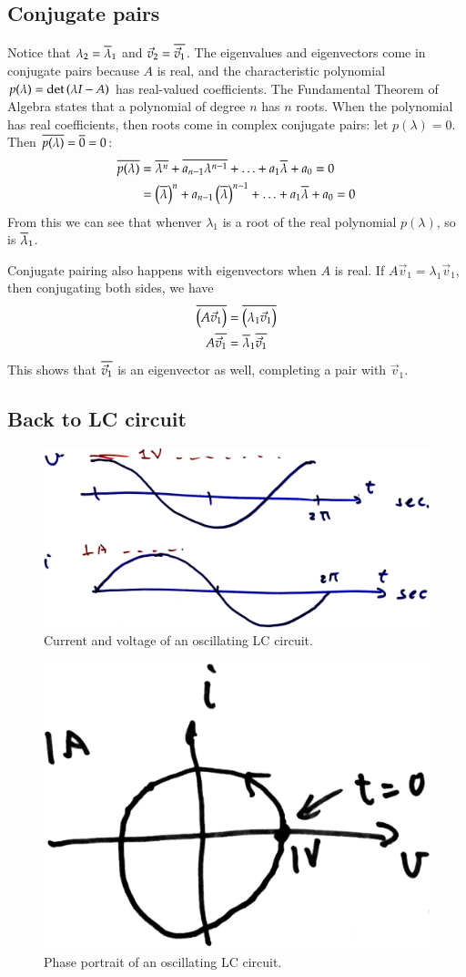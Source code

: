 \subsection{Conjugate pairs}
Notice that \(\lambda_2 = \overline \lambda_1\) and \(\vec v_2 = \overline{\vec v_1}\).
The eigenvalues and eigenvectors come in conjugate pairs because \(A\) is real, and the characteristic polynomial \(p(\lambda) = \det\del{\lambda I - A}\) has real-valued coefficients.
The Fundamental Theorem of Algebra states that a polynomial of degree \(n\) has \(n\) roots.
When the polynomial has real coefficients, then roots come in complex conjugate pairs:
let \(p(\lambda) = 0\).
Then \(\overline{p(\lambda)} = \overline{0} = 0\):
\begin{align}
  \conj{p(\lambda)}
  &= \conj{\lambda^n} + \conj{a_{n-1} \lambda^{n-1}} + \ldots + a_1 \conj{\lambda} + a_0 =0\\
  &= \del{\conj{\lambda}}^n + a_{n-1} \del{\conj{\lambda}}^{n-1}
+ \ldots + a_1 \conj{\lambda} + a_0 =0
\end{align}
From this we can see that whenver \(\lambda_1\) is a root of the real polynomial \(p(\lambda)\), so is \(\overline{\lambda}_1\).

Conjugate pairing also happens with eigenvectors when \(A\) is real.
If \(A \vec v_1 = \lambda_1 \vec v_1\), then conjugating both sides, we have
\begin{align}
  \conj{\del{A \vec v_1}}
  &= \conj{\del{\lambda_1 \vec v_1}}\\
  A \conj {\vec v_1}
  &= \conj \lambda_1 \conj{\vec v_1}
\end{align}
This shows that \(\overline{\vec v_1}\) is an eigenvector as well, completing a pair with \(\vec v_1\).

\subsection{Back to LC circuit}
\begin{figure}
  \centering
  \includegraphics[width=0.6\linewidth]{figures/7/LC-vi}
  \caption{Current and voltage of an oscillating LC circuit.}
  \label{figure:lec7-LC-vi}
\end{figure}
\begin{figure}
  \centering
  \includegraphics[width=0.3\linewidth]{figures/7/LC-iv-parametric}
  \caption{Phase portrait of an oscillating LC circuit.}
  \label{figure:lec7-iv-parametric}
\end{figure}

